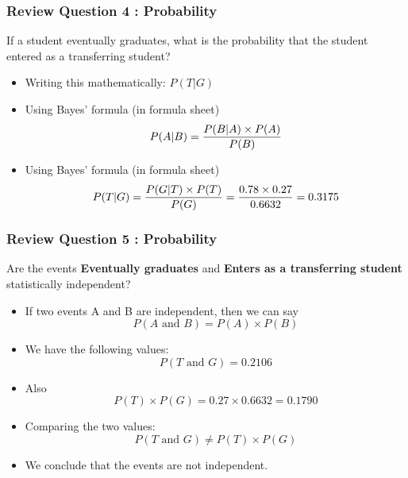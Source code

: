 \begin{frame}
\frametitle{Review Question 4 :  Probability}
If a student eventually graduates, what is the probability that the student entered
as a transferring student?
\begin{itemize}
\item Writing this mathematically: $P(T|G)$
\item Using Bayes' formula (in formula sheet)
\[P(A|B)=  {P(B|A)\times P(A)\over P(B)} \]
\item Using Bayes' formula (in formula sheet)
\[P(T|G)=  {P(G|T)\times P(T)\over P(G)} = \frac{0.78 \times 0.27}{0.6632} = 0.3175 \]
\end{itemize}
\end{frame}
\begin{frame}
\frametitle{Review Question 5 :  Probability}
Are the events \textbf{Eventually graduates} and \textbf{Enters as a transferring student}
statistically independent?

\begin{itemize}
\item If two events A and B are independent, then we can say
\[P(A \mbox{ and } B) = P(A) \times P(B)\]
\item We have the following values:
\[P(T \mbox{ and } G) = 0.2106\]
\item Also
\[P(T) \times P(G) = 0.27 \times 0.6632 = 0.1790\]
\item Comparing the two values:
\[P(T \mbox{ and } G) \neq P(T) \times P(G)\]
\item We conclude that the events are not independent.
\end{itemize}
\end{frame}
